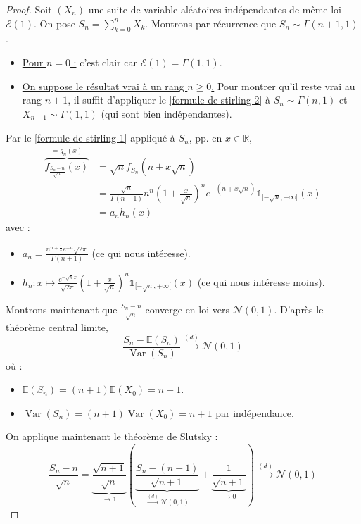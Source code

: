 	\begin{proof}
		Soit $(X_n)$ une suite de variable aléatoires indépendantes de même loi $\mathcal{E}(1)$. On pose $S_n = \sum_{k=0}^n X_k$. Montrons par récurrence que $S_n \sim \Gamma(n+1, 1)$.
		\begin{itemize}
			\item \uline{Pour $n = 0$ :} c'est clair car $\mathcal{E}(1) = \Gamma(1, 1)$.
			\item \uline{On suppose le résultat vrai à un rang $n \geq 0$.} Pour montrer qu'il reste vrai au rang $n+1$, il suffit d'appliquer le \cref{formule-de-stirling-2} à $S_n \sim \Gamma(n, 1)$ et $X_{n+1} \sim \Gamma(1, 1)$ (qui sont bien indépendantes).
		\end{itemize}
		Par le \cref{formule-de-stirling-1} appliqué à $S_n$, pp. en $x \in \mathbb{R}$,
		\begin{align*}
			\overbrace{f_{\frac{S_n - n}{\sqrt{n}}}(x)}^{= g_n(x)} & = \sqrt{n} f_{S_n} (n + x \sqrt{n}) \\
			& = \frac{\sqrt{n}}{\Gamma(n+1)} n^n \left(1 + \frac{x}{\sqrt{n}} \right)^n e^{-(n + x\sqrt{n})} \mathbb{1}_{[-\sqrt{n}, +\infty[}(x) \\
			& = a_n h_n(x)
		\end{align*}
		avec :
		\begin{itemize}
			\item $a_n = \frac{n^{n+\frac{1}{2}} e^{-n} \sqrt{2 \pi}}{\Gamma(n+1)}$ (ce qui nous intéresse).
			\item $h_n : x \mapsto \frac{e^{-\sqrt{n} x}}{\sqrt{2\pi}} \left( 1 + \frac{x}{\sqrt{n}} \right)^n \mathbb{1}_{[-\sqrt{n}, +\infty[}(x)$ (ce qui nous intéresse moins).
		\end{itemize}
		\medskip
		Montrons maintenant que $\frac{S_n - n}{\sqrt{n}}$ converge en loi vers $\mathcal{N}(0,1)$. D'après le théorème central limite,
		\[ \frac{S_n - \mathbb{E}(S_n)}{\operatorname{Var}(S_n)} \overset{(d)}{\longrightarrow} \mathcal{N}(0,1) \]
		où :
		\begin{itemize}
			\item $\mathbb{E}(S_n) = (n+1) \mathbb{E}(X_0) = n+1$.
			\item $\operatorname{Var}(S_n) = (n+1) \operatorname{Var}(X_0) = n+1$ par indépendance.
		\end{itemize}
		On applique maintenant le théorème de Slutsky :
		\[ \frac{S_n - n}{\sqrt{n}} = \underbrace{\frac{\sqrt{n+1}}{\sqrt{n}}}_{\longrightarrow 1} \left( \underbrace{\frac{S_n - (n+1)}{\sqrt{n+1}}}_{\overset{(d)}{\longrightarrow} \mathcal{N}(0,1)} + \underbrace{\frac{1}{\sqrt{n+1}}}_{\longrightarrow 0} \right) \overset{(d)}{\longrightarrow} \mathcal{N}(0,1) \]

\end{proof}
